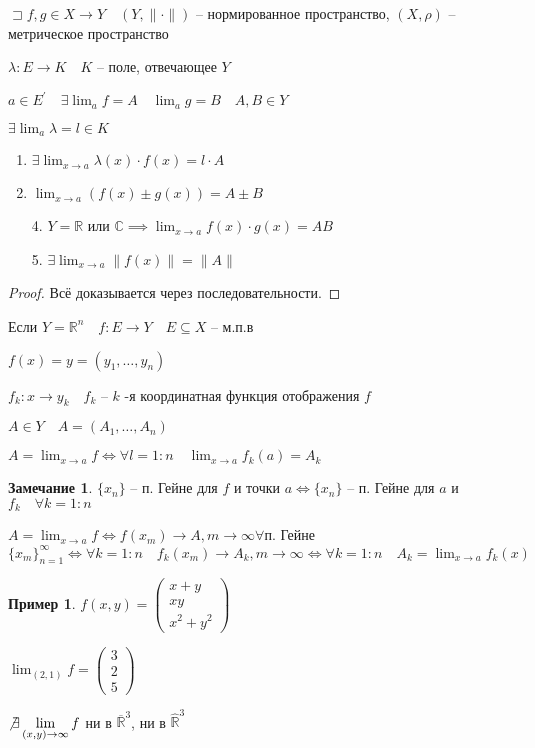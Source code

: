 \documentclass{book}
\newcommand\R{\ensuremath{\mathbb{R}}}
\renewcommand\C{\ensuremath{\mathbb{C}}}
\newcommand{\p}[1]{#1^{\prime}}
\newcommand{\ov}[1]{\overline{#1}}
\theoremstyle{definition}
\newtheorem*{note}{Замечание}
\newtheorem*{example}{Пример}
\begin{document}
\begin{theorem}

    $\sqsupset f, g\in X\to Y\quad (Y, \|\cdot \|)$ -- нормированное пространство, $(X, \rho)$ -- метрическое пространство

     $\lambda:E\to K\quad K$ -- поле, отвечающее $Y$

     $a\in \p E\quad \exists \lim_af=A\quad \lim_ag = B\quad A, B\in Y$

     $\exists \lim_a\lambda = l\in K$

     \begin{enumerate}
         \item $\exists \lim_{x \to a} \lambda(x)\cdot f(x) = l\cdot A$
         \item $\lim_{x \to a} \left( f(x)\pm g(x) \right) =A\pm B$
         \item[4.] $Y=\R$ или $\C \implies \lim_{x \to a} f(x)\cdot g(x) = AB$
         \item[5.] $\exists \lim_{x \to a} \|f(x)\| = \|A\|$
     \end{enumerate}
\end{theorem}
\begin{proof}
    Всё доказывается через последовательности.
\end{proof}

    Если $Y = \R^n\quad f:E\to Y\quad E\subseteq X$ -- м.п.в

    $f(x) = y = (y_1, \ldots, y_{n})$

    $f_k:x\to y_k\quad f_k$ --  $k$ -я координатная функция отображения  $f$

    $A\in Y\quad A = (A_1, \ldots, A_n)$

    $A = \lim_{x \to a} f \iff \forall l = 1:n\quad \lim_{x \to a} f_k(a) = A_k$
\begin{note}
    $\{x_{n} \}$ -- п. Гейне для $f$ и точки  $a \iff \{x_{n} \}$ -- п. Гейне для $a$ и  $f_k\quad \forall k = 1:n$

    $A = \lim_{x \to a} f \iff f(x_m)\to A, m\to \infty  \forall $п. Гейне $\{x_m\}_{n=1}^{\infty } \iff \forall k=1:n\quad f_k(x_m)\to A_k, m\to \infty  \iff \forall k=1:n\quad A_k = \lim_{x \to a} f_k(x)$
\end{note}

\begin{example}
    $f(x, y) = \begin{pmatrix} x+y\\xy\\x^2+y^2 \end{pmatrix} $ 

    $\lim_{(2,1)}f = \begin{pmatrix} 3\\2\\5 \end{pmatrix}  $

    $\not\exists \lim_{(x, y)\to \infty }f $ ни в $\ov{\R}^3$, ни в  $\widehat{\R}^3$
\end{example}
\end{document}
